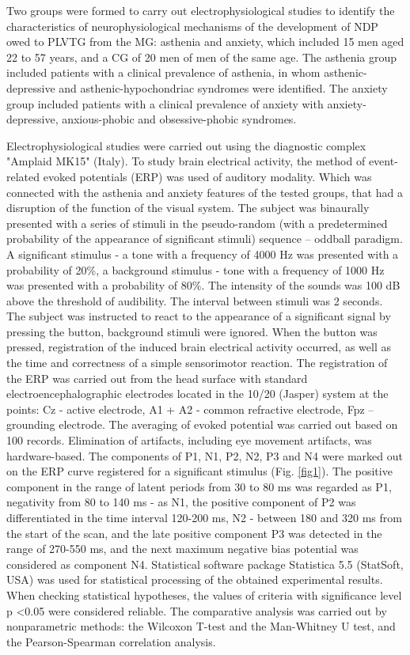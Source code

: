 \documentclass[twocolumn]{article}
\begin{document}
\par Two groups were formed to carry out electrophysiological studies to identify the characteristics of neurophysiological mechanisms of the development of NDP owed to PLVTG from the MG: asthenia and anxiety, which included 15 men aged 22 to 57 years, and a CG of 20 men of men of the same age. The asthenia group included patients with a clinical prevalence of asthenia, in whom asthenic-depressive and asthenic-hypochondriac syndromes were identified. The anxiety group included patients with a clinical prevalence of anxiety with anxiety-depressive, anxious-phobic and obsessive-phobic syndromes.
\par Electrophysiological studies were carried out using the diagnostic complex "Amplaid MK15" (Italy). To study brain electrical activity, the method of event-related evoked potentials (ERP) was used of auditory modality. Which was connected with the asthenia and anxiety features of the tested groups, that had a disruption of the function of the visual system. The subject was binaurally presented with a series of stimuli in the pseudo-random (with a predetermined probability of the appearance of significant stimuli) sequence – oddball paradigm. A significant stimulus - a tone with a frequency of 4000 Hz was presented with a probability of 20\%, a background stimulus - tone with a frequency of 1000 Hz was presented with a probability of 80\%. The intensity of the sounds was 100 dB above the threshold of audibility\cite{bib12}. The interval between stimuli was 2 seconds. The subject was instructed to react to the appearance of a significant signal by pressing the button, background stimuli were ignored. When the button was pressed, registration of the induced brain electrical activity occurred, as well as the time and correctness of a simple sensorimotor reaction. The registration of the ERP was carried out from the head surface with standard electroencephalographic electrodes located in the 10/20 (Jasper) system at the points: Cz - active electrode, A1 + A2 - common refractive electrode, Fpz – grounding electrode. The averaging of evoked potential was carried out based on 100 records\cite{bib13}. Elimination of artifacts, including eye movement artifacts, was hardware-based. The components of P1, N1, P2, N2, P3 and N4 were marked out on the ERP curve registered for a significant stimulus (Fig. \ref{fig1}). The positive component in the range of latent periods from 30 to 80 ms was regarded as P1, negativity from 80 to 140 ms - as N1, the positive component of P2 was differentiated in the time interval 120-200 ms, N2 - between 180 and 320 ms from the start of the scan, and the late positive component P3 was detected in the range of 270-550 ms, and the next maximum negative bias potential was considered as component N4. Statistical software package Statistica 5.5 (StatSoft, USA) was used for statistical processing of the obtained experimental results. When checking statistical hypotheses, the values of criteria with significance level p \textless{}0.05 were considered reliable. The comparative analysis was carried out by nonparametric methods: the Wilcoxon T-test and the Man-Whitney U test, and the Pearson-Spearman correlation analysis\cite{bib14}.
\end{document}
